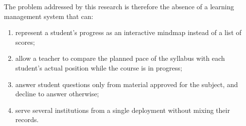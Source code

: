 The problem addressed by this research is therefore the absence of a learning management system that can:
\begin{enumerate}
    \item represent a student's progress as an interactive mindmap instead of a list of scores;
    \item allow a teacher to compare the planned pace of the syllabus with each student's actual position while the course is in progress;
    \item answer student questions only from material approved for the subject, and decline to answer otherwise;
    \item serve several institutions from a single deployment without mixing their records.
\end{enumerate}
